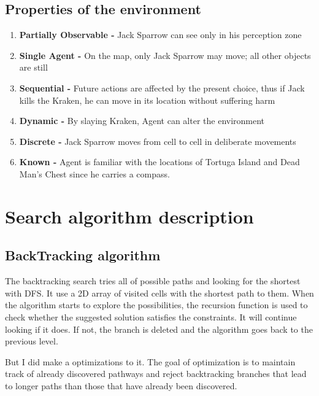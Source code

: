 \documentclass[a4paper,12pt]{article}
\begin{document}
\subsection{Properties of the environment}
\begin{enumerate}
    \item \textbf{Partially Observable -} Jack Sparrow can see only in his perception zone
    \item \textbf{Single Agent -} On the map, only Jack Sparrow may move; all other objects are still
    \item \textbf{Sequential -} Future actions are affected by the present choice, thus if Jack kills the Kraken, he can move in its location without suffering harm
    \item \textbf{Dynamic -} By slaying Kraken, Agent can alter the environment
    \item \textbf{Discrete -} Jack Sparrow moves from cell to cell in deliberate movements
    \item \textbf{Known -} Agent is familiar with the locations of Tortuga Island and Dead Man's Chest since he carries a compass.
\end{enumerate}

\section{Search algorithm description}
\subsection{BackTracking algorithm}
The backtracking search tries all of possible paths and looking for the shortest with DFS. It use a 2D array of visited cells with the shortest path to them. When the algorithm starts to explore the possibilities, the recursion function is used to check whether the suggested solution satisfies the constraints. It will continue looking if it does. If not, the branch is deleted and the algorithm goes back to the previous level.

But I did make a optimizations to it. The goal of optimization is to maintain track of already discovered pathways and reject backtracking branches that lead to longer paths than those that have already been discovered. 
\end{document}
